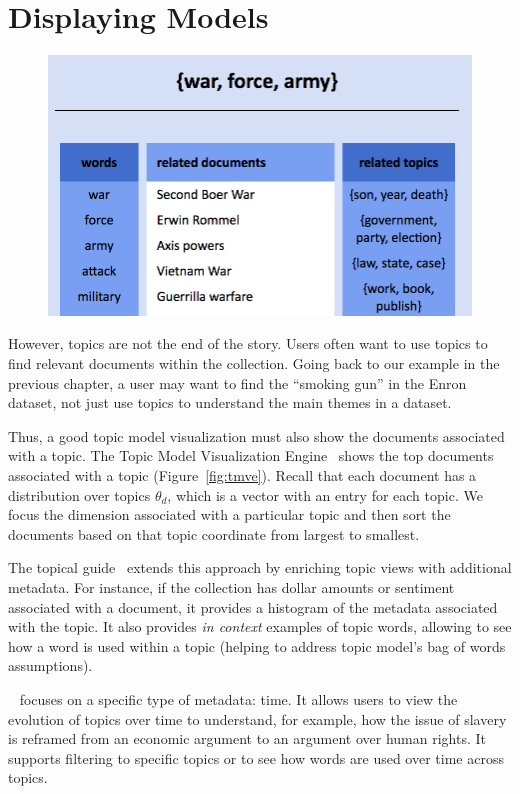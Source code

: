 \section{Displaying Models}

\begin{figure}
  \includegraphics[width=.5\linewidth]{figures/viz_tmve}
  \caption{ }
  \label{fig:llda}
\end{figure}


However, topics are not the end of the story.  Users often want to use topics to
find relevant documents within the collection.  Going back to our example in the
previous chapter, a user may want to find the ``smoking gun'' in the Enron
dataset, not just use topics to understand the main themes in a dataset.

Thus, a good topic model visualization must also show the documents associated
with a topic.  The Topic Model Visualization Engine~\citep{chaney-12} shows the
top documents associated with a topic (Figure~\ref{fig:tmve}).  Recall that each
document has a distribution over topics $\theta_d$, which is a vector with an
entry for each topic.  We focus the dimension associated with a particular topic
and then sort the documents based on that topic coordinate from largest to
smallest.

The topical guide~\citep{gardner-10} extends this approach by enriching topic
views with additional metadata.  For instance, if the collection has dollar
amounts or sentiment~\cite{pang-08} associated with a document, it provides a
histogram of the metadata associated with the topic.  It also provides \emph{in
  context} examples of topic words, allowing to see how a word is used within a
topic (helping to address topic model's bag of words assumptions).

~\citep{eistenstein-14} focuses on a specific type of metadata: time.
It allows users to view the evolution of topics over time to understand, for
example, how the issue of slavery is reframed from an economic argument to an
argument over human rights.  It supports filtering to specific topics or to see
how words are used over time across topics.

